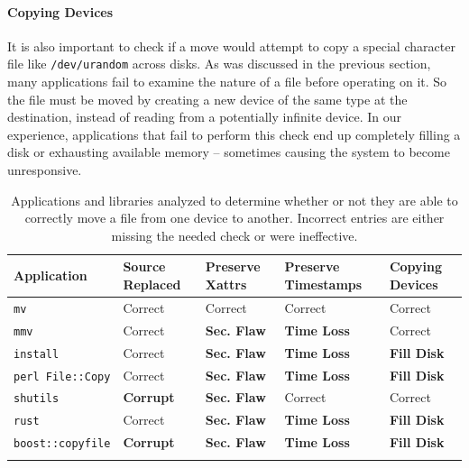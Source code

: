 \paragraph{Copying Devices}

It is also important to check if a move would attempt to copy a special
character file like {\tt /dev/urandom} across disks.  As was discussed in the
previous section, many applications fail to examine the nature of a file before
operating on it.  So the file must be moved by creating a new device of the same
type at the destination, instead of reading from a potentially infinite device.
In our experience, applications that fail to perform this check end up
completely filling a disk or exhausting available memory -- sometimes causing the
system to become unresponsive.


 \begin{table}[t]
    \scriptsize{}
    \begin{tabular}{l p{1cm} p{1cm} p{1.2cm} p{1cm}}
    \toprule{}
        Application     & Source Replaced & Preserve Xattrs & Preserve Timestamps & Copying Devices\\
\hline
        {\tt mv}              & Correct             & Correct         & Correct             & Correct\\
        {\tt mmv}             & Correct             & {\bf Sec. Flaw} & {\bf Time Loss} & Correct\\
        {\tt install}         & Correct             & {\bf Sec. Flaw} & {\bf Time Loss} & {\bf Fill Disk} \\
        {\tt perl File::Copy} & Correct             & {\bf Sec. Flaw} & {\bf Time Loss} & {\bf Fill Disk} \\
        {\tt shutils}         & {\bf Corrupt}	& {\bf Sec. Flaw} 	& Correct             & Correct\\
        {\tt rust}             & Correct             & {\bf Sec. Flaw} & {\bf Time Loss} & {\bf Fill Disk} \\
        {\tt boost::copyfile} & {\bf Corrupt}	      & {\bf Sec. Flaw} & {\bf Time Loss} & {\bf Fill Disk} \\
    \bottomrule{}
    \end{tabular}
    \caption{Applications and libraries analyzed to determine whether or not
      they are able to correctly move a file from one device to another.
Incorrect entries are either missing the needed check or were ineffective.}
    \label{table:crossdevice}
\end{table}

